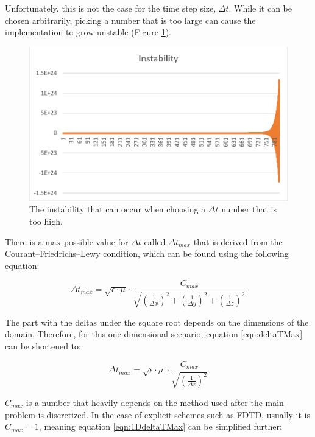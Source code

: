 Unfortunately, this is not the case for the time step size, $\Delta t$. While it can be chosen arbitrarily, picking a number that is too large can cause the implementation to grow unstable (Figure \ref{fig:fdtd1dinstability}).

\begin{figure}[!h]
	\centering
	\includegraphics[scale=0.5]{Figures/fdtd1dinstability}
	\decoRule
	\caption[Instability]{The instability that can occur when choosing a $\Delta t$ number that is too high.}
	\label{fig:fdtd1dinstability}
\end{figure}

There is a max possible value for $\Delta t$ called $\Delta t_{max}$ that is derived from the Courant–Friedrichs–Lewy condition, which can be found using the following equation:

\begin{equation}
	\label{eqn:deltaTMax}
	\Delta t_{max} = \sqrt{\epsilon \cdot \mu} \cdot \frac{C_{max}}{\sqrt{(\frac{1}{\Delta x})^2 + (\frac{1}{\Delta y})^2 + (\frac{1}{\Delta z})^2}}
\end{equation}

The part with the deltas under the square root depends on the dimensions of the domain. Therefore, for this one dimensional scenario, equation \ref{eqn:deltaTMax} can be shortened to:

\begin{equation}
	\label{eqn:1DdeltaTMax}
	\Delta t_{max} = \sqrt{\epsilon \cdot \mu} \cdot \frac{C_{max}}{\sqrt{(\frac{1}{\Delta z})^2}}
\end{equation}

$C_{max}$ is a number that heavily depends on the method used after the main problem is discretized. In the case of explicit schemes such as FDTD, usually it is $C_{max} = 1$, meaning equation \ref{eqn:1DdeltaTMax} can be simplified further:

